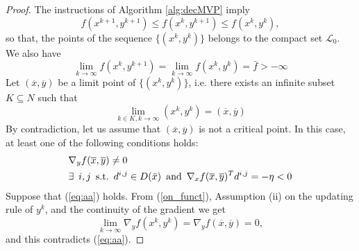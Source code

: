 \begin{proof}
The instructions of Algorithm \ref{alg:decMVP} imply
$$
f(x^{k+1}, y^{k+1})\le f(x^{k}, y^{k+1}) \leq f(x^{k}, y^{k}),
$$
so that, the points of the sequence $\{(x^{k}, y^{k})\}$ belongs to the compact set $\mathcal{L}_0$.
We also have
\begin{equation}\label{on_funct}
 \lim_{k\to\infty} f(x^k,y^{k+1})=\lim_{k\to\infty} f(x^{k},y^{k})=\bar f>-\infty
\end{equation}
Let $(\overline{x},\overline{y})$ be a limit point of $\{(x^k, y^k)\}$, i.e. there exists an infinite subset $K \subseteq N$ such that
\begin{equation}\label{eq:asim}
\lim_{k \in K, k \rightarrow \infty} (x^k, y^k) = (\overline{x},\overline{y})
\end{equation}
By contradiction, let us assume that $(\overline{x},\overline{y})$ is not a critical point. 
In this case, at least one of the following conditions holds:
\begin{subequations}
\begin{align}
&\nabla_y f(\overline{x},\overline{y}) \neq 0  \label{eq:aa}\\
&\exists \enskip i, j \enskip  \text{s.t.} \enskip d^{i,j}\in D(\bar x) \enskip  \text{and} \enskip  \nabla_x f(\overline{x},\overline{y})^T d^{i,j} = -\eta < 0 \label{eq:bb}
\end{align}
\end{subequations}
Suppose that (\ref{eq:aa}) holds.
From (\ref{on_funct}), Assumption (ii) on the updating rule of $y^k$, and the continuity of the gradient we get
$$
\lim_{k\to\infty}\nabla_y f(x^k,y^k)=\nabla_y f(\overline{x},\overline{y})=0,
$$
and this contradicts (\ref{eq:aa}).


\end{proof}
